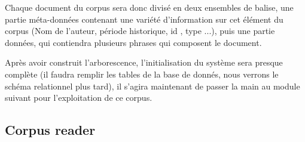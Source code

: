 \documentclass[]{report}
\begin{document}
			\par
			Chaque document du corpus sera donc divisé en deux ensembles de balise, une partie méta-données contenant une variété d'information sur cet élément du corpus
			(Nom de l'auteur, période historique, id , type ...), puis une partie données, qui contiendra plusieurs phrases qui composent le document.
			\par 
			Après avoir construit l'arborescence, l'initialisation du système sera presque complète (il faudra remplir les tables de la base de donnés, nous verrons le schéma relationnel plus tard), il s'agira maintenant de passer la main au module suivant pour l'exploitation de ce corpus.
			
		\subsection{Corpus reader}
\end{document}
